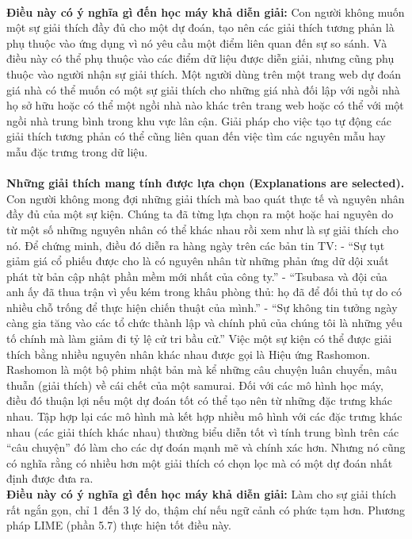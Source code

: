 \\\textbf{Điều này có ý nghĩa gì đến học máy khả diễn giải:} Con người không muốn một sự giải thích đầy đủ cho một dự đoán, tạo nên các giải thích tương phản là phụ thuộc vào ứng dụng vì nó yêu cầu một điểm liên quan đến sự so sánh. Và điều này có thể phụ thuộc vào các điểm dữ liệu được diễn giải, nhưng cũng phụ thuộc vào người nhận sự giải thích. Một người dùng trên một trang web dự đoán giá nhà có thể muốn có một sự giải thích cho những giá nhà đối lập với ngồi nhà họ sở hữu hoặc có thể một ngồi nhà nào khác trên trang web hoặc có thể với một ngồi nhà trung bình trong khu vực lân cận. Giải pháp cho việc tạo tự động các giải thích tương phản có thể cũng liên quan đến việc tìm các nguyên mẫu hay mẫu đặc trưng trong dữ liệu.
\\\\\textbf{Những giải thích mang tính được lựa chọn (Explanations are selected).} Con người không mong đợi những giải thích mà bao quát thực tế và nguyên nhân đầy đủ của một sự kiện. Chúng ta đã từng lựa chọn ra một hoặc hai nguyên do từ một số những nguyên nhân có thể khác nhau rồi xem như là sự giải thích cho nó. Để chứng minh, điều đó diễn ra hàng ngày trên các bản tin TV: 
- “Sự tụt giảm giá cổ phiếu được cho là có nguyên nhân từ những phản ứng dữ dội xuất phát từ bản cập nhật phần mềm mới nhất của công ty.”
- “Tsubasa và đội của anh ấy đã thua trận vì yếu kém trong khâu phòng thủ: họ đã để đối thủ tự do có nhiều chỗ trống để thực hiện chiến thuật của mình.”
- “Sự không tin tưởng ngày càng gia tăng vào các tổ chức thành lập và chính phủ của chúng tôi là những yếu tố chính mà làm giảm đi tỷ lệ cử tri bầu cử.”
Việc một sự kiện có thể được giải thích bằng nhiều nguyên nhân khác nhau được gọi là Hiệu ứng Rashomon.  Rashomon là một bộ phim nhật bản mà kể những câu chuyện luân chuyển, mâu thuẫn (giải thích) về cái chết của một samurai. Đối với các mô hình học máy, điều đó thuận lợi nếu một dự đoán tốt có thể tạo nên từ những đặc trưng khác nhau. Tập hợp lại các mô hình mà kết hợp nhiều mô hình với các đặc trưng khác nhau (các giải thích khác nhau) thường biểu diễn tốt vì tính trung bình trên các “câu chuyện” đó làm cho các dự đoán mạnh mẽ và chính xác hơn. Nhưng nó cũng có nghĩa rằng có nhiều hơn một giải thích có chọn lọc mà có một dự đoán nhất định được đưa ra.
\\\textbf{Điều này có ý nghĩa gì đến học máy khả diễn giải:} Làm cho sự giải thích rất ngắn gọn, chỉ 1 đến 3 lý do, thậm chí nếu ngữ cảnh có phức tạm hơn. Phương pháp LIME (phần 5.7) thực hiện tốt điều này.
\\\\
